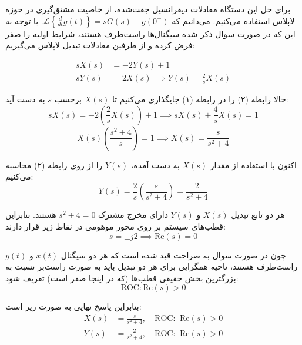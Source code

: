 برای حل این دستگاه معادلات دیفرانسیل جفت‌شده، از خاصیت مشتق‌گیری در حوزه لاپلاس استفاده می‌کنیم. می‌دانیم که $\mathcal{L}\left\{\frac{d}{dt}g(t)\right\} = sG(s) - g(0^-)$. با توجه به این که در صورت سوال ذکر شده سیگنال‌ها راست‌طرف هستند، شرایط اولیه را صفر فرض کرده و از طرفین معادلات تبدیل لاپلاس می‌گیریم:

\begin{align}
sX(s) &= -2Y(s) + 1 \\
sY(s) &= 2X(s) \implies Y(s) = \frac{2}{s}X(s)
\end{align}

حالا رابطه (۲) را در رابطه (۱) جایگذاری می‌کنیم تا $X(s)$ برحسب $s$ به دست آید:
\begin{equation*}
sX(s) = -2\left(\frac{2}{s}X(s)\right) + 1 \implies sX(s) + \frac{4}{s}X(s) = 1
\end{equation*}
\begin{equation*}
X(s)\left( \frac{s^2 + 4}{s} \right) = 1 \implies X(s) = \frac{s}{s^2 + 4}
\end{equation*}

اکنون با استفاده از مقدار $X(s)$ به دست آمده، $Y(s)$ را از روی رابطه (۲) محاسبه می‌کنیم:
\begin{equation*}
Y(s) = \frac{2}{s} \left( \frac{s}{s^2 + 4} \right) = \frac{2}{s^2 + 4}
\end{equation*}

هر دو تابع تبدیل $X(s)$ و $Y(s)$ دارای مخرج مشترک $s^2 + 4 = 0$ هستند. بنابراین قطب‌های سیستم بر روی محور موهومی در نقاط زیر قرار دارند:
\begin{equation*}
s = \pm j2 \implies \text{Re}(s) = 0
\end{equation*}

چون در صورت سوال به صراحت قید شده است که هر دو سیگنال $x(t)$ و $y(t)$ {راست‌طرف} هستند، ناحیه همگرایی برای هر دو تبدیل باید به صورت راست‌بر نسبت به بزرگترین بخش حقیقی قطب‌ها (که در اینجا صفر است) تعریف شود:
\begin{equation*}
\text{ROC}: \text{Re}(s) > 0
\end{equation*}

بنابراین پاسخ نهایی به صورت زیر است:
\begin{align*}
X(s) &= \frac{s}{s^2 + 4}, \quad \text{ROC: } \ \text{Re}(s) > 0 \\
Y(s) &= \frac{2}{s^2 + 4}, \quad \text{ROC: } \ \text{Re}(s) > 0
\end{align*}
